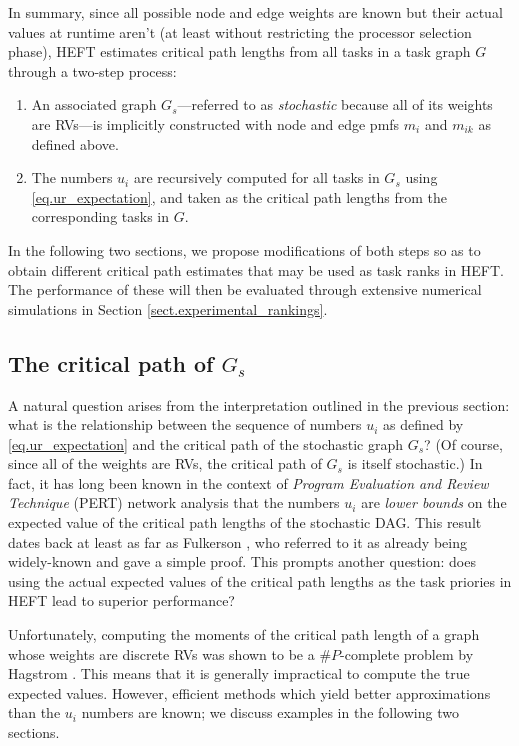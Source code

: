 \documentclass[12pt]{article}
\begin{document}
In summary, since all possible node and edge weights are known but their actual values at runtime aren't (at least without restricting the processor selection phase), HEFT estimates critical path lengths from all tasks in a task graph $G$ through a two-step process:
\begin{enumerate}
	\item An associated graph $G_s$---referred to as {\em stochastic} because all of its weights are RVs---is implicitly constructed with node and edge pmfs $m_i$ and $m_{ik}$ as defined above.   
	\item The numbers $u_i$ are recursively computed for all tasks in $G_s$ using \eqref{eq.ur_expectation}, and taken as the critical path lengths from the corresponding tasks in $G$.      
\end{enumerate}
In the following two sections, we propose modifications of both steps so as to obtain different critical path estimates that may be used as task ranks in HEFT. The performance of these will then be evaluated through extensive numerical simulations in Section \ref{sect.experimental_rankings}.

\subsection{The critical path of $G_s$}
\label{subsect.sharper_bounds}

A natural question arises from the interpretation outlined in the previous section: what is the relationship between the sequence of numbers $u_i$ as defined by \eqref{eq.ur_expectation} and the critical path of the stochastic graph $G_s$? (Of course, since all of the weights are RVs, the critical path of $G_s$ is itself stochastic.) In fact, it has long been known in the context of {\em Program Evaluation and Review Technique} (PERT) network analysis that the numbers $u_i$ are {\em lower bounds} on the expected value of the critical path lengths of the stochastic DAG. This result dates back at least as far as Fulkerson \cite{fulk62}, who referred to it as already being widely-known and gave a simple proof. This prompts another question: does using the actual expected values of the critical path lengths as the task priories in HEFT lead to superior performance?

Unfortunately, computing the moments of the critical path length of a graph whose weights are discrete RVs was shown to be a $\#P$-complete problem by Hagstrom \cite{hagstrom88}. This means that it is generally impractical to compute the true expected values. However, efficient methods which yield better approximations than the $u_i$ numbers are known; we discuss examples in the following two sections.  
\end{document}
